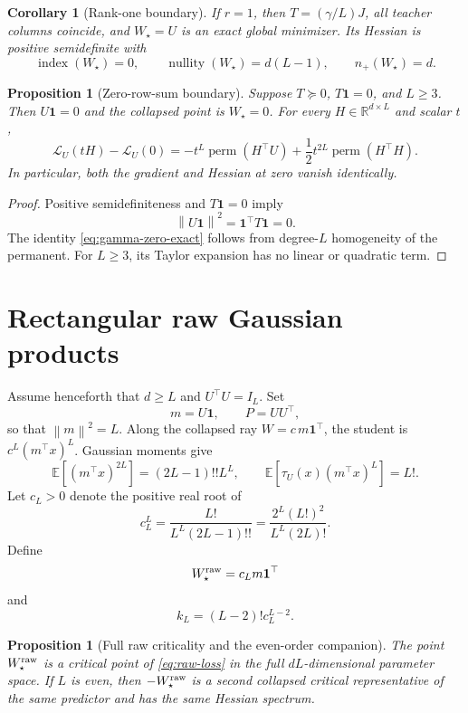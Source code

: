 \documentclass[11pt]{article}
\newtheorem{proposition}[theorem]{Proposition}
\newtheorem{corollary}[theorem]{Corollary}
\newcommand{\R}{\mathbb{R}}
\newcommand{\one}{\mathbf{1}}
\newcommand{\perm}{\operatorname{perm}}
\newcommand{\ind}{\operatorname{index}}
\newcommand{\nul}{\operatorname{nullity}}
\newcommand{\norm}[1]{\left\lVert #1\right\rVert}
\begin{document}
\begin{corollary}[Rank-one boundary]
\label{cor:rank-one-boundary}
If $r=1$, then $T=(\gamma/L)J$, all teacher columns coincide, and $W_\star=U$ is an exact global minimizer.  Its Hessian is positive semidefinite with
\[
\ind(W_\star)=0,
\qquad
\nul(W_\star)=d(L-1),
\qquad n_+(W_\star)=d.
\]
\end{corollary}

\begin{proposition}[Zero-row-sum boundary]
\label{prop:gamma-zero}
Suppose $T\succeq0$, $T\one=0$, and $L\geq3$.  Then $U\one=0$ and the collapsed point is $W_\star=0$.  For every $H\in\R^{d\times L}$ and scalar $t$,
\begin{equation}
\mathcal L_U(tH)-\mathcal L_U(0)
=-t^L\perm(H^\top U)+\frac12t^{2L}\perm(H^\top H).
\label{eq:gamma-zero-exact}
\end{equation}
In particular, both the gradient and Hessian at zero vanish identically.
\end{proposition}

\begin{proof}
Positive semidefiniteness and $T\one=0$ imply
\[
\norm{U\one}^2=\one^\top T\one=0.
\]
The identity \eqref{eq:gamma-zero-exact} follows from degree-$L$ homogeneity of the permanent.  For $L\geq3$, its Taylor expansion has no linear or quadratic term.
\end{proof}

\section{Rectangular raw Gaussian products}

Assume henceforth that $d\geq L$ and $U^\top U=I_L$.  Set
\[
m=U\one,\qquad P=UU^\top,
\]
so that $\norm{m}^2=L$.  Along the collapsed ray $W=c\,m\one^\top$, the student is $c^L(m^\top x)^L$.  Gaussian moments give
\[
\mathbb E[(m^\top x)^{2L}]=(2L-1)!!L^L,
\qquad
\mathbb E[\tau_U(x)(m^\top x)^L]=L!.
\]
Let $c_L>0$ denote the positive real root of
\begin{equation}
\boxed{
c_L^L=\frac{L!}{L^L(2L-1)!!}
=\frac{2^L(L!)^2}{L^L(2L)!}
}.
\label{eq:raw-c}
\end{equation}
Define
\[
W_\star^{\rm raw}=c_Lm\one^\top
\]
and
\begin{equation}
k_L=(L-2)!c_L^{L-2}.
\label{eq:raw-k}
\end{equation}

\begin{proposition}[Full raw criticality and the even-order companion]
\label{prop:raw-criticality}
The point $W_\star^{\rm raw}$ is a critical point of \eqref{eq:raw-loss} in the full $dL$-dimensional parameter space.  If $L$ is even, then $-W_\star^{\rm raw}$ is a second collapsed critical representative of the same predictor and has the same Hessian spectrum.
\end{proposition}
\end{document}
